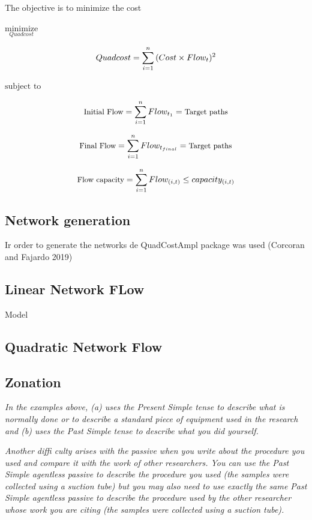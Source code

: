 \documentclass[]{article}
\begin{document}
The objective is to minimize the cost

\(\underset{Quadcost}{\text{minimize}}\)

\[\small Quadcost =  \sum_{i=1}^n{(Cost\times Flow_t)^2}\]

\(\text{subject to}\)

\[\small \text{Initial Flow} = \sum_{i=1}^n{Flow_{t_1}} = \text{Target paths}\]

\[\small \text{Final Flow} = \sum_{i=1}^n{Flow_{t_{final}}} = \text{Target paths}\]

\[\small \text{Flow capacity} = \sum_{i=1}^n{Flow_{(i,t)}} \leq capacity_{(i,t)}\]

\hypertarget{network-generation}{%
\subsection{Network generation}\label{network-generation}}

Ir order to generate the networks de QuadCostAmpl package was used (Corcoran and Fajardo 2019)

\hypertarget{linear-network-flow}{%
\subsection{Linear Network FLow}\label{linear-network-flow}}

Model

\hypertarget{quadratic-network-flow}{%
\subsection{Quadratic Network Flow}\label{quadratic-network-flow}}

\hypertarget{zonation}{%
\subsection{Zonation}\label{zonation}}

\emph{In the examples above, (a) uses the Present Simple tense to
describe what is normally done or to describe a standard piece of equipment
used in the research and (b) uses the Past Simple tense to describe what
you did yourself.}

\emph{Another diffi culty arises with the passive when you write about the
procedure you used and compare it with the work of other researchers.
You can use the Past Simple agentless passive to describe the procedure
you used (the samples were collected using a suction tube) but you may
also need to use exactly the same Past Simple agentless passive to describe
the procedure used by the other researcher whose work you are citing (the
samples were collected using a suction tube).}
\end{document}
